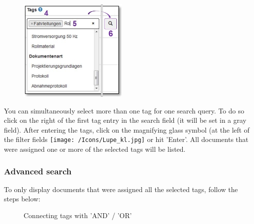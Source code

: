 \vspace{\baselineskip}

\begin{figure}
\vspace{-30pt}
\includegraphics[height=50mm]{../chapters/11_Dokumentenablage/pictures/11-2-8_TagEingabe.jpg}
\end{figure}
You can simultaneously select more than one tag for one search query. To do so click on the right of the first tag entry  in the search field  (it will be set in a gray field). After entering the tags, click on the magnifying glass symbol (at the left of the filter fields \texttt{[image: /Icons/Lupe\_kl.jpg]}  or hit 'Enter'. All documents that were assigned one or more of the selected tags will be listed.

\vspace{\baselineskip}

\subsubsection{Advanced search}

To only display documents that were assigned all the selected tags, follow the steps below: 

\begin{figure}[H]
\caption{Connecting tags with 'AND' / 'OR'}
\end{figure}

